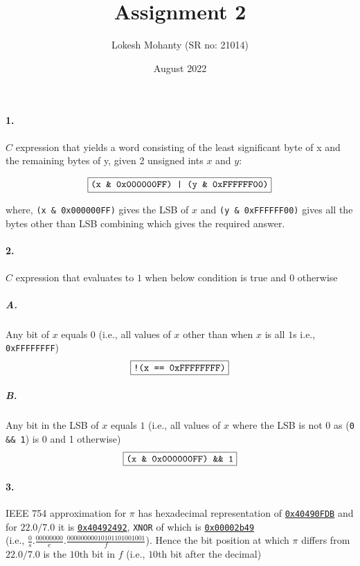 \documentclass[12pt, letterpaper]{article}
\title{Assignment 2}
\author{Lokesh Mohanty (SR no: 21014)}
\date{August 2022}
\begin{document}
\maketitle

\paragraph{1.} $C$ expression that yields a word consisting of the least significant byte of x and the remaining bytes of y, given 2 unsigned ints $x$ and $y$:

\[\boxed{\text{\verb~(x \& 0x000000FF) | (y \& 0xFFFFFF00)~}}\]

where, \verb+(x & 0x000000FF)+ gives the LSB of $x$ and \verb+(y & 0xFFFFFF00)+ gives all the bytes other than LSB combining which gives the required answer.

\paragraph{2.} $C$ expression that evaluates to $1$ when below condition is true and $0$ otherwise
\subparagraph{A.} Any bit of $x$ equals $0$ (i.e., all values of $x$ other than when $x$ is all $1$s i.e., \verb~0xFFFFFFFF~)
\[\boxed{\text{\verb~!(x == 0xFFFFFFFF)~}}\]
\subparagraph{B.} Any bit in the LSB of $x$ equals $1$ (i.e., all values of $x$ where the LSB is not $0$ as
(\verb~0 && 1~) is 0 and 1 otherwise)
\[\boxed{\text{\verb~(x \& 0x000000FF) \&\& 1~}}\]

\paragraph{3.} IEEE 754 approximation for $\pi$ has hexadecimal representation of \underline{\verb~0x40490FDB~} and for $22.0/7.0$ it is \underline{\verb~0x40492492~}, \verb~XNOR~ of which is \underline{\verb~0x00002b49~}\\ (i.e., $\frac{0}{s}.\frac{00000000}{e}.\frac{00000000010101101001001}{f}$). Hence the bit position at which $\pi$ differs from $22.0/7.0$ is the $\boxed{10\text{th}}$ bit in $f$ (i.e., $10$th bit after the decimal)
\end{document}
